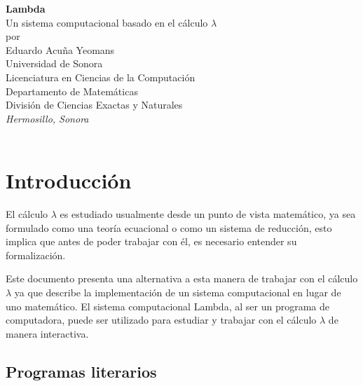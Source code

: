 \documentclass[letterpaper, twoside, openright, 11pt]{book}%
\newcommand{\titulo}{{\Tt{}Lambda\nwendquote}}
\newcommand{\subtitulo}{Un sistema computacional basado en el cálculo \( \lambda \)}
\newcommand{\autor}{Eduardo Acuña Yeomans}
\newcommand{\lugar}{Hermosillo, Sonora}
\newcommand{\institucion}{Universidad de Sonora}
\newcommand{\programa}{Licenciatura en Ciencias de la Computación}
\newcommand{\departamento}{Departamento de Matemáticas}
\newcommand{\division}{División de Ciencias Exactas y Naturales}
\newcommand{\fecha}{2016}
\newlength{\titlepagetop}
\newlength{\titlepageby}
\newlength{\titlepagemiddle}
\begin{document}
\pagestyle{myheadings}

\thispagestyle{empty}

\begin{center}
  \vspace*{\titlepagetop}
  \Huge{\textbf{\titulo}}\\
  \large{\subtitulo}\\
  \vspace*{\titlepageby}
  \normalsize{por}\\
  \vspace*{\titlepageby}
  \large{\autor}\\
  \vspace*{\titlepagemiddle}
  \institucion \\
  \small{\programa}\\
  \small{\departamento}\\
  \small{\division}\\
  \bigskip
  \small{\textit{\lugar}}\\
  \normalfont{\fecha}\\
\end{center}

\frontmatter

\tableofcontents

\mainmatter

\chapter{Introducción}

\noindent El cálculo $ \lambda $ es estudiado usualmente desde un punto de vista matemático, ya sea formulado como una teoría ecuacional o como un sistema de reducción, esto implica que antes de poder trabajar con él, es necesario entender su formalización.

Este documento presenta una alternativa a esta manera de trabajar con el cálculo $ \lambda $ ya que describe la implementación de un sistema computacional en lugar de uno matemático. El sistema computacional {\Tt{}Lambda\nwendquote}, al ser un programa de computadora, puede ser utilizado para estudiar y trabajar con el cálculo $ \lambda $ de manera interactiva.

\section{Programas literarios}
\end{document}
